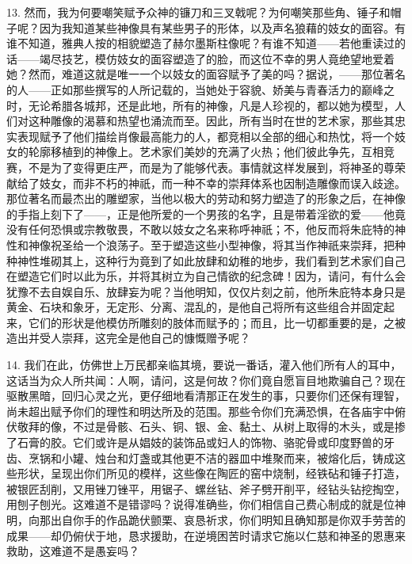 13. 然而，我为何要嘲笑赋予众神的镰刀和三叉戟呢？为何嘲笑那些角、锤子和帽子呢？因为我知道某些神像具有某些男子的形体，以及声名狼藉的妓女的面容。有谁不知道，雅典人按的相貌塑造了赫尔墨斯柱像呢？有谁不知道——若他重读过的话——竭尽技艺，模仿妓女的面容塑造了的脸，而这位不幸的男人竟绝望地爱着她？然而，难道这就是唯一一个以妓女的面容赋予了美的吗？据说，——那位著名的人——正如那些撰写的人所记载的，当她处于容貌、娇美与青春活力的巅峰之时，无论希腊各城邦，还是此地，所有的神像，凡是人珍视的，都以她为模型，人们对这种雕像的渴慕和热望也涌流而至。因此，所有当时在世的艺术家，那些其忠实表现赋予了他们描绘肖像最高能力的人，都竞相以全部的细心和热忱，将一个妓女的轮廓移植到的神像上。艺术家们美妙的充满了火热；他们彼此争先，互相竞赛，不是为了变得更庄严，而是为了能够代表。事情就这样发展到，将神圣的尊荣献给了妓女，而非不朽的神祇，而一种不幸的崇拜体系也因制造雕像而误入歧途。那位著名而最杰出的雕塑家，当他以极大的劳动和努力塑造了的形象之后，在神像的手指上刻下了——，正是他所爱的一个男孩的名字，且是带着淫欲的爱——他竟没有任何恐惧或宗教敬畏，不敢以妓女之名来称呼神祇；不，他反而将朱庇特的神性和神像祝圣给一个浪荡子。至于塑造这些小型神像，将其当作神祇来崇拜，把种种神性堆砌其上，这种行为竟到了如此放肆和幼稚的地步，我们看到艺术家们自己在塑造它们时以此为乐，并将其树立为自己情欲的纪念碑！因为，请问，有什么会犹豫不去自娱自乐、放肆妄为呢？当他明知，仅仅片刻之前，他所朱庇特本身只是黄金、石块和象牙，无定形、分离、混乱的，是他自己将所有这些组合并固定起来，它们的形状是他模仿所雕刻的肢体而赋予的；而且，比一切都重要的是，之被造出并受人崇拜，这完全是他自己的慷慨赠予呢？\par

14. 我们在此，仿佛世上万民都亲临其境，要说一番话，灌入他们所有人的耳中，这话当为众人所共闻：人啊，请问，这是何故？你们竟自愿盲目地欺骗自己？现在驱散黑暗，回归心灵之光，更仔细地看清那正在发生的事，只要你们还保有理智，尚未超出赋予你们的理性和明达所及的范围。那些令你们充满恐惧，在各庙宇中俯伏敬拜的像，不过是骨骸、石头、铜、银、金、黏土、从树上取得的木头，或是掺了石膏的胶。它们或许是从娼妓的装饰品或妇人的饰物、骆驼骨或印度野兽的牙齿、烹锅和小罐、烛台和灯盏或其他更不洁的器皿中堆聚而来，被熔化后，铸成这些形状，呈现出你们所见的模样，这些像在陶匠的窑中烧制，经铁砧和锤子打造，被银匠刮削，又用锉刀锉平，用锯子、螺丝钻、斧子劈开削平，经钻头钻挖掏空，用刨子刨光。这难道不是错谬吗？说得准确些，你们相信自己费心制成的就是位神明，向那出自你手的作品跪伏颤栗、哀恳祈求，你们明知且确知那是你双手劳苦的成果——却仍俯伏于地，恳求援助，在逆境困苦时请求它施以仁慈和神圣的恩惠来救助，这难道不是愚妄吗？\par


